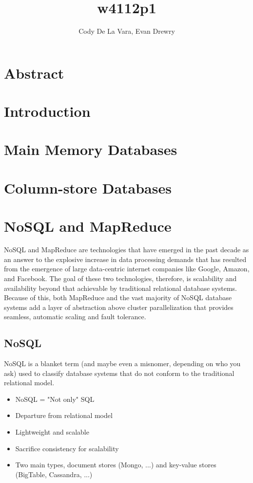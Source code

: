 \documentclass[11pt,a4paper]{report}
\author{Cody De La Vara, Evan Drewry}
\title{w4112p1}
\begin{document}
\maketitle

\section*{Abstract}
\section*{Introduction}
\section*{Main Memory Databases}
\section*{Column-store Databases}

\section*{NoSQL and MapReduce}
NoSQL and MapReduce are technologies that have emerged in the past decade as an answer to the explosive increase in data processing demands that has resulted from the emergence of large data-centric internet companies like Google, Amazon, and Facebook. The goal of these two technologies, therefore, is scalability and availability beyond that achievable by traditional relational database systems. Because of this, both MapReduce and the vast majority of NoSQL database systems add a layer of abstraction above cluster parallelization that provides seamless, automatic scaling and fault tolerance.
\subsection*{NoSQL}
NoSQL is a blanket term (and maybe even a misnomer, depending on who you ask) used to classify database systems that do not conform to the traditional relational model.
\begin{itemize}
\item NoSQL = "Not only" SQL 
\item Departure from relational model
\item Lightweight and scalable
\item Sacrifice consistency for scalability
\item Two main types, document stores (Mongo, ...) and key-value stores (BigTable, Cassandra, ...)
\end{itemize}
\end{document}
